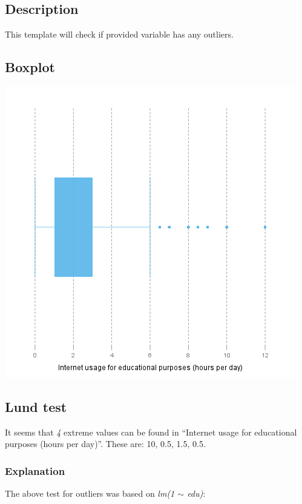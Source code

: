 \documentclass[]{article}
\makeatletter
\def\maxwidth{\ifdim\Gin@nat@width>\linewidth\linewidth
\else\Gin@nat@width\fi}
\let\Oldincludegraphics\includegraphics
\renewcommand{\includegraphics}[1]{\Oldincludegraphics[width=\maxwidth]{#1}}
\makeatother
\begin{document}
\subsection{Description}

This template will check if provided variable has any outliers.

\subsection{Boxplot}

\href{ea1797865a9d9a619be0e9c5d55d5de7-hires.png}{\includegraphics{ea1797865a9d9a619be0e9c5d55d5de7.png}}

\subsection{Lund test}

It seems that \emph{4} extreme values can be found in ``Internet usage
for educational purposes (hours per day)''. These are: 10, 0.5, 1.5,
0.5.

\subsubsection{Explanation}

The above test for outliers was based on \emph{lm(1 \ensuremath{\sim}
edu)}:
\end{document}
